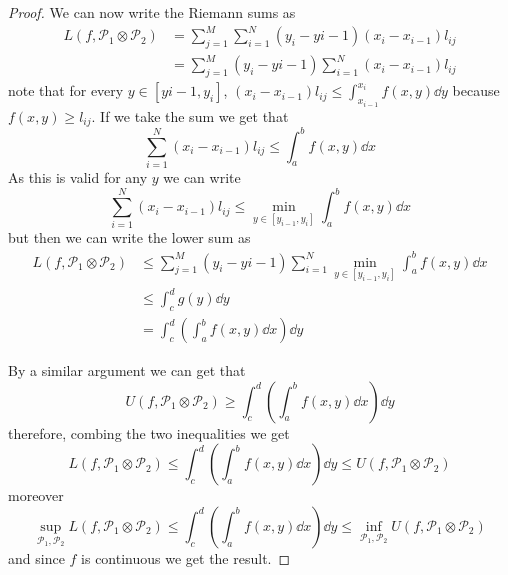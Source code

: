 \documentclass[12pt]{extarticle}
\begin{document}
\begin{proof}
    We can now write the Riemann sums as
    \begin{align}
        L(f, \mathcal P_1 \otimes \mathcal P_2) & = \sum_{j = 1}^M \sum_{i = 1}^N (y_i -y{i-1}) (x_i - x_{i-1}) l_{ij} \\
                                                & = \sum_{j = 1}^M (y_i -y{i-1}) \sum_{i = 1}^N (x_i - x_{i-1}) l_{ij}
    \end{align}
    note that for every $y \in [y{i-1}, y_i]$, $(x_i - x_{i-1}) l_{ij} \leq \int_{x_{i-1}}^{x_i} f(x, y)\dd{y}$ because $f(x, y) \geq l_{ij}$.
    If we take the sum we get that \begin{equation}
        \sum_{i = 1}^N (x_i -x_{i-1})l_{ij} \leq \int_a^b f(x, y) \dd{x}
    \end{equation}
    As this is valid for any $y$ we can write
    \begin{equation}
        \sum_{i = 1}^N (x_i -x_{i-1})l_{ij} \leq \min_{y \in [y_{i-1}, y_i]} \int_a^b f(x, y) \dd{x}
    \end{equation}
    but then we can write the lower sum as
    \begin{align}
        L(f, \mathcal P_1 \otimes \mathcal P_2) & \leq \sum_{j = 1}^M (y_i -y{i-1}) \sum_{i = 1}^N \min_{y \in [y_{i-1}, y_i]} \int_a^b f(x, y) \dd{x} \\
                                                & \leq \int_c^d g(y) \dd{y}                                                                            \\
                                                & = \int_c^d \left( \int_a^b f(x, y) \dd{x} \right) \dd{y}
    \end{align}

    By a similar argument we can get that
    \begin{equation}
        U(f, \mathcal P_1 \otimes \mathcal P_2) \geq \int_c^d \left( \int_a^b f(x, y) \dd{x} \right) \dd{y}
    \end{equation}
    therefore, combing the two inequalities we get
    \begin{equation}
        L(f, \mathcal P_1 \otimes \mathcal P_2) \leq \int_c^d \left( \int_a^b f(x, y) \dd{x} \right) \dd{y} \leq U(f, \mathcal P_1 \otimes \mathcal P_2)
    \end{equation}
    moreover
    \begin{equation}
        \sup_{\mathcal P_1, \mathcal P_2} L(f, \mathcal P_1 \otimes \mathcal P_2) \leq \int_c^d \left( \int_a^b f(x, y) \dd{x} \right) \dd{y} \leq \inf_{\mathcal P_1, \mathcal P_2} U(f, \mathcal P_1 \otimes \mathcal P_2)
    \end{equation}
    and since $f$ is continuous we get the result.
\end{proof}
\end{document}
